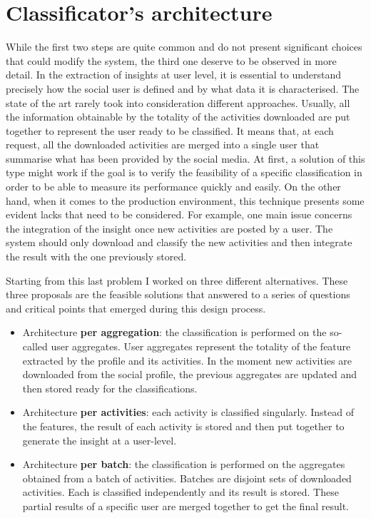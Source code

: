 \section{Classificator's architecture}
While the first two steps are quite common and do not present significant choices that could modify the system, the third one deserve to be observed in more detail.
In the extraction of insights at user level, it is essential to understand precisely how the social user is defined and by what data it is characterised.
The state of the art rarely took into consideration different approaches. Usually, all the information obtainable by the totality of the activities downloaded are put together to represent the user ready to be classified.
It means that, at each request, all the downloaded activities are merged into a single user that summarise what has been provided by the social media.
At first, a solution of this type might work if the goal is to verify the feasibility of a specific classification in order to be able to measure its performance quickly and easily.
On the other hand, when it comes to the production environment, this technique presents some evident lacks that need to be considered.
For example, one main issue concerns the integration of the insight once new activities are posted by a user. %
The system should only download and classify the new activities and then integrate the result with the one previously stored.

Starting from this last problem I worked on three different alternatives. These three proposals are the feasible solutions that answered to a series of questions and critical points that emerged during this design process. 
\begin{itemize}
    \item Architecture \textbf{per aggregation}: the classification is performed on the so-called user aggregates. User aggregates represent the totality of the feature extracted by the profile and its activities. In the moment new activities are downloaded from the social profile, the previous aggregates are updated and then stored ready for the classifications.
    \item Architecture \textbf{per activities}: each activity is classified singularly. Instead of the features, the result of each activity is stored and then put together to generate the insight at a user-level.
    \item Architecture \textbf{per batch}: the classification is performed on the aggregates obtained from a batch of activities. Batches are disjoint sets of downloaded activities. Each is classified independently and its result is stored. These partial results of a specific user are merged together to get the final result. 
\end{itemize}

